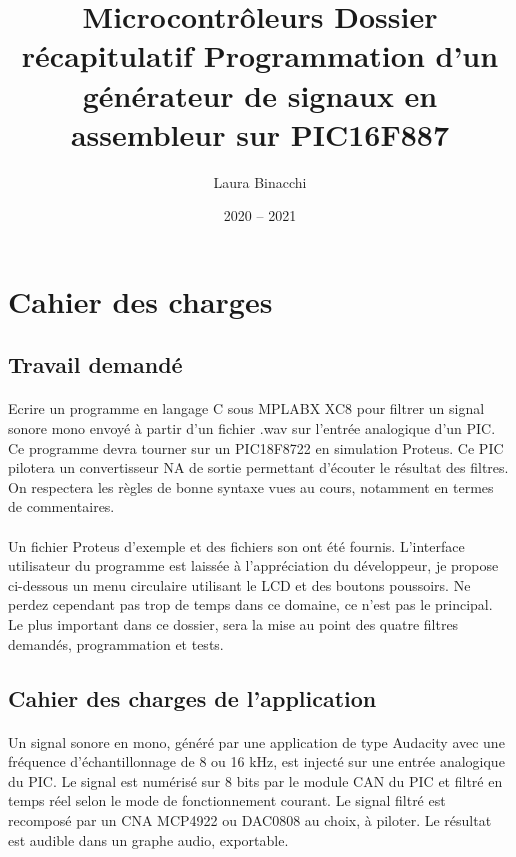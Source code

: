 \documentclass{article}
\title{Microcontrôleurs\bigbreak \bigbreak
    \large Dossier récapitulatif\bigbreak
    \normalsize Programmation d'un générateur de signaux en assembleur sur PIC16F887\bigbreak}
\date{2020 -- 2021}
\author{Laura Binacchi}
\begin{document}
    
    \newpage
    \tableofcontents
    \newpage

    \section{Cahier des charges}

    \subsection{Travail demandé}
    \paragraph{}
    Ecrire un programme en langage C sous MPLABX XC8 pour filtrer un signal sonore mono envoyé à partir d’un fichier .wav sur l’entrée analogique d’un PIC. Ce programme devra tourner sur un PIC18F8722 en simulation Proteus. Ce PIC pilotera un convertisseur NA de sortie permettant d’écouter le résultat des filtres. On respectera les règles de bonne syntaxe vues au cours, notamment en termes de commentaires.

    \paragraph{}
    Un fichier Proteus d’exemple et des fichiers son ont été fournis. L’interface utilisateur du programme est laissée à l’appréciation du développeur, je propose ci-dessous un menu circulaire utilisant le LCD et des boutons poussoirs. Ne perdez cependant pas trop de temps dans ce domaine, ce n’est pas le principal. Le plus important dans ce dossier, sera la mise au point des quatre filtres demandés, programmation et tests.

    \subsection{Cahier des charges de l’application}
    \paragraph{}
    Un signal sonore en mono, généré par une application de type Audacity avec une fréquence d’échantillonnage de 8 ou 16 kHz, est injecté sur une entrée analogique du PIC. Le signal est numérisé sur 8 bits par le module CAN du PIC et filtré en temps réel selon le mode de fonctionnement courant. Le signal filtré est recomposé par un CNA MCP4922 ou DAC0808 au choix, à piloter. Le résultat est audible dans un graphe audio, exportable.
\end{document}

